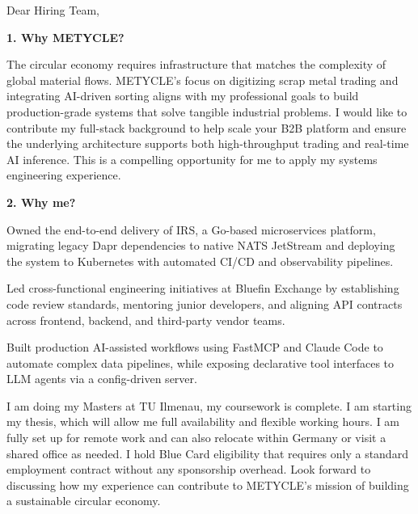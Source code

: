 \documentclass[11pt,a4paper]{coverletter}
\begin{document}

\opening{Dear Hiring Team,}

\vspace{8pt}\noindent\textbf{1. Why METYCLE?}\par\vspace{3pt}

The circular economy requires infrastructure that matches the complexity of global material flows. METYCLE’s focus on digitizing scrap metal trading and integrating AI-driven sorting aligns with my professional goals to build production-grade systems that solve tangible industrial problems. I would like to contribute my full-stack background to help scale your B2B platform and ensure the underlying architecture supports both high-throughput trading and real-time AI inference. This is a compelling opportunity for me to apply my systems engineering experience.

\vspace{8pt}\noindent\textbf{2. Why me?}\par\vspace{3pt}

\bullets

  \item Owned the end-to-end delivery of IRS, a Go-based microservices platform, migrating legacy Dapr dependencies to native NATS JetStream and deploying the system to Kubernetes with automated CI/CD and observability pipelines.

  \item Led cross-functional engineering initiatives at Bluefin Exchange by establishing code review standards, mentoring junior developers, and aligning API contracts across frontend, backend, and third-party vendor teams.

  \item Built production AI-assisted workflows using FastMCP and Claude Code to automate complex data pipelines, while exposing declarative tool interfaces to LLM agents via a config-driven server.

\bulletsend

I am doing my Masters at TU Ilmenau, my coursework is complete. I am starting my thesis, which will allow me full availability and flexible working hours. I am fully set up for remote work and can also relocate within Germany or visit a shared office as needed. I hold Blue Card eligibility that requires only a standard employment contract without any sponsorship overhead. Look forward to discussing how my experience can contribute to METYCLE’s mission of building a sustainable circular economy.
\end{document}
